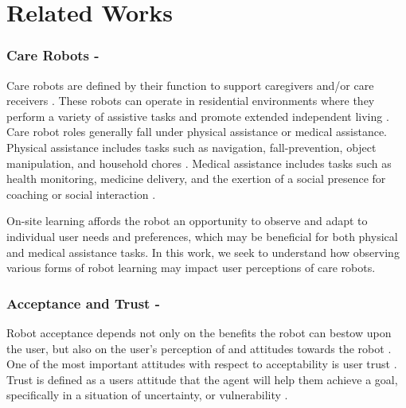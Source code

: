 \documentclass[letterpaper]{article} %
\begin{document}
\section{Related Works}
\label{sec:relatedworks}

\subsubsection{Care Robots -}
Care robots are defined by their function to support caregivers and/or care receivers \cite{van_wynsberghe_designing_2013}. These robots can operate in residential environments where they perform a variety of assistive tasks and promote extended independent living \cite{johnson_socially_2014,sabanovic_robot_2015, fiorini_assistive_2021, lee_reframing_2018}. Care robot roles generally fall under physical assistance or medical assistance. Physical assistance includes tasks such as navigation, fall-prevention, object manipulation, and household chores \cite{moxi, fischinger_hobbit_2016, swisslog_healthcare_autonomous_nodate, kittmann_let_2015, kostavelis_ramcip_2016, miseikis_lio-personal_2020}. Medical assistance includes tasks such as health monitoring, medicine delivery, and the exertion of a social presence for coaching or social interaction \cite{vitanza_assistive_2019, coradeschi_giraffplus_2013, umbrico_holistic_2020, nao, pepper, martinez-martin_pharos_2019}.

On-site learning affords the robot an opportunity to observe and adapt to individual user needs and preferences, which may be beneficial for both physical and medical assistance tasks. In this work, we seek to understand how observing various forms of robot learning may impact user perceptions of care robots.

\subsubsection{Acceptance and Trust -}
Robot acceptance depends not only on the benefits the robot can bestow upon the user, but also on the user's perception of and attitudes towards the robot \cite{cesta_psychological_2007}. One of the most important attitudes with respect to acceptability is user trust \cite{yagoda_you_2012, langer_trust_2019}. Trust is defined as a users attitude that the agent will help them achieve a goal, specifically in a situation of uncertainty, or vulnerability \cite{kohn_measurement_2021, ullman_what_2018}.
\end{document}

